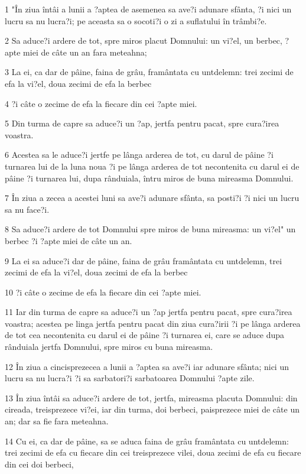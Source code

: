 \par 1 "În ziua întâi a lunii a ?aptea de asemenea sa ave?i adunare sfânta, ?i nici un lucru sa nu lucra?i; pe aceasta sa o socoti?i o zi a suflatului în trâmbi?e.
\par 2 Sa aduce?i ardere de tot, spre miros placut Domnului: un vi?el, un berbec, ?apte miei de câte un an fara meteahna;
\par 3 La ei, ca dar de pâine, faina de grâu, framântata cu untdelemn: trei zecimi de efa la vi?el, doua zecimi de efa la berbec
\par 4 ?i câte o zecime de efa la fiecare din cei ?apte miei.
\par 5 Din turma de capre sa aduce?i un ?ap, jertfa pentru pacat, spre cura?irea voastra.
\par 6 Acestea sa le aduce?i jertfe pe lânga arderea de tot, cu darul de pâine ?i turnarea lui de la luna noua ?i pe lânga arderea de tot necontenita cu darul ei de pâine ?i turnarea lui, dupa rânduiala, întru miros de buna mireasma Domnului.
\par 7 În ziua a zecea a acestei luni sa ave?i adunare sfânta, sa posti?i ?i nici un lucru sa nu face?i.
\par 8 Sa aduce?i ardere de tot Domnului spre miros de buna mireasma: un vi?el" un berbec ?i ?apte miei de câte un an.
\par 9 La ei sa aduce?i dar de pâine, faina de grâu framântata cu untdelemn, trei zecimi de efa la vi?el, doua zecimi de efa la berbec
\par 10 ?i câte o zecime de efa la fiecare din cei ?apte miei.
\par 11 Iar din turma de capre sa aduce?i un ?ap jertfa pentru pacat, spre cura?irea voastra; acestea pe linga jertfa pentru pacat din ziua cura?irii ?i pe lânga arderea de tot cea necontenita cu darul ei de pâine ?i turnarea ei, care se aduce dupa rânduiala jertfa Domnului, spre miros cu buna mireasma.
\par 12 În ziua a cincisprezecea a lunii a ?aptea sa ave?i iar adunare sfânta; nici un lucru sa nu lucra?i ?i sa sarbatori?i sarbatoarea Domnului ?apte zile.
\par 13 În ziua întâi sa aduce?i ardere de tot, jertfa, mireasma placuta Domnului: din cireada, treisprezece vi?ei, iar din turma, doi berbeci, paisprezece miei de câte un an; dar sa fie fara meteahna.
\par 14 Cu ei, ca dar de pâine, sa se aduca faina de grâu framântata cu untdelemn: trei zecimi de efa cu fiecare din cei treisprezece vilei, doua zecimi de efa cu fiecare din cei doi berbeci,
